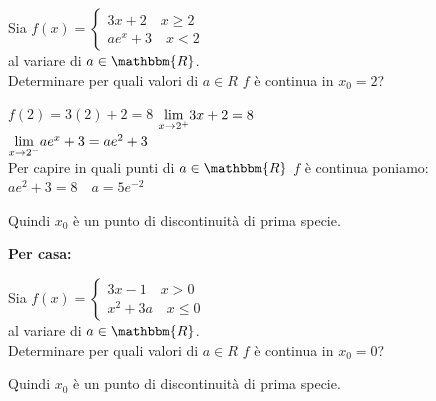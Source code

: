 \documentclass[12pt]{report}
\newcounter{exercise}
\begin{document}
 	\begin{assignment}{}{}
 		Sia $f(x) = \begin{cases}
 			3x + 2 \quad x \geq 2 \\
 			ae^x + 3 \quad x < 2
 		\end{cases}$ \\
 		al variare di $a \in \mathbbm{R}$. \\
 		Determinare per quali valori di $a \in R$ $f$ è continua in $x_0 = 2$? \\
 		\begin{exercise}{}{}
 			$f(2) = 3(2) + 2 = 8$
 			$\mathlarger{\lim_{x \to 2^+}}3x + 2 = 8$ \\
 			$\mathlarger{\lim_{x \to 2^-}}ae^x + 3 = ae^2 + 3$ \\
 			Per capire in quali punti di $a \in \mathbbm{R}$ $f$ è continua poniamo: $ae^2 + 3 = 8 \quad a = 5e^{-2}$
 		\end{exercise}
 		Quindi $x_0$ è un punto di discontinuità di prima specie.
 	\end{assignment}

 	\textbf{Per casa:} \\
 	\begin{assignment}{}{}

 		Sia $f(x) = \begin{cases}
 			3x - 1 \quad x > 0 \\
 			x^2 + 3a \quad x \leq 0
 		\end{cases}$ \\
 		al variare di $a \in \mathbbm{R}$. \\
 		Determinare per quali valori di $a \in R$ $f$ è continua in $x_0 = 0$? \\
 		\begin{exercise}{}{}

 		\end{exercise}
 		Quindi $x_0$ è un punto di discontinuità di prima specie.
 	\end{assignment}
\end{document}
